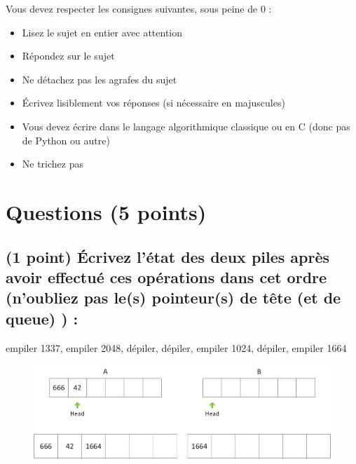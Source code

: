 \documentclass[11pt,a4paper]{article}
\begin{document}
\MakeExamTitle                   %


\bigskip
\bigskip

Vous devez respecter les consignes suivantes, sous peine de 0 :

\begin{itemize}
\item Lisez le sujet en entier avec attention
\item Répondez sur le sujet
\item Ne détachez pas les agrafes du sujet
\item \'Ecrivez lisiblement vos réponses (si nécessaire en majuscules)
\item Vous devez écrire dans le langage algorithmique classique ou en C (donc pas de Python ou autre)
\item Ne trichez pas
\end{itemize}

\bigskip


\section{Questions (5 points)}

\subsection{(1 point) \'Ecrivez l'état des deux piles après avoir effectué ces opérations dans cet ordre (n'oubliez pas le(s) pointeur(s) de tête (et de queue) ) : }

\bigskip

\vfill
\hspace{0pt}

\begin{center}

\begin{large}
empiler 1337, empiler 2048, dépiler, dépiler, empiler 1024, dépiler, empiler 1664
\end{large}


\bigskip

\begin{figure}[ht!]
\centering
\centerline{  %
\includegraphics[scale=1]{img/correction_Exercice1_pile.png}
}
\end{figure}

\end{center}
\end{document}
